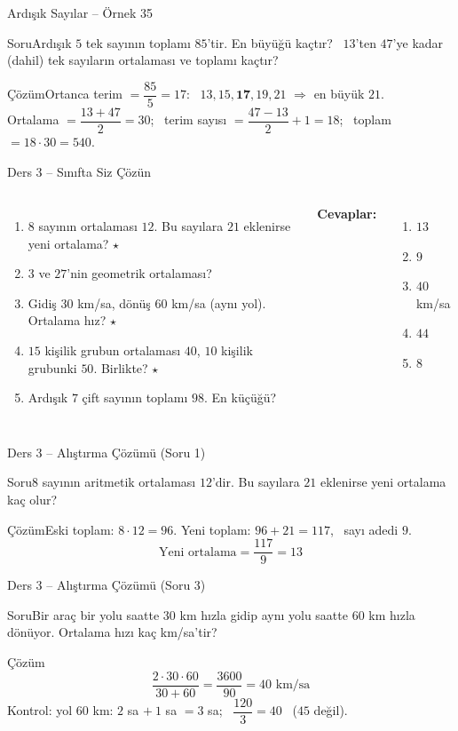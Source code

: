 \documentclass[aspectratio=169,11pt]{beamer}
\newcommand{\soru}[3]{%
\begin{frame}{#1}
  \begin{block}{Soru}\large #2\end{block}
  \pause
  \begin{exampleblock}{Çözüm}\large #3\end{exampleblock}
\end{frame}}
\begin{document}
\soru{Ardışık Sayılar -- Örnek 35}
{Ardışık \(5\) tek sayının toplamı \(85\)'tir. En büyüğü kaçtır? \ \(13\)'ten \(47\)'ye kadar (dahil) tek sayıların ortalaması ve toplamı kaçtır?}
{Ortanca terim \(=\dfrac{85}{5}=17\): \ \(13,15,\mathbf{17},19,21\) \(\Rightarrow\) en büyük \(21\).\\[3pt]
Ortalama \(=\dfrac{13+47}{2}=30\); \ terim sayısı \(=\dfrac{47-13}{2}+1=18\); \ toplam \(=18\cdot 30=540\).}

\begin{frame}{Ders 3 -- Sınıfta Siz Çözün}
\begin{columns}[t]
\begin{enumerate}
\item \(8\) sayının ortalaması \(12\). Bu sayılara \(21\) eklenirse yeni ortalama? \(\star\)
\item \(3\) ve \(27\)'nin geometrik ortalaması?
\item Gidiş \(30\) km/sa, dönüş \(60\) km/sa (aynı yol). Ortalama hız? \(\star\)
\item \(15\) kişilik grubun ortalaması \(40\), \(10\) kişilik grubunki \(50\). Birlikte? \(\star\)
\item Ardışık \(7\) çift sayının toplamı \(98\). En küçüğü?
\end{enumerate}
\pause
\textbf{Cevaplar:}
\begin{enumerate}
\item \(13\)
\item \(9\)
\item \(40\) km/sa
\item \(44\)
\item \(8\)
\end{enumerate}
\end{columns}
\vspace{4pt}{\footnotesize \(\star\) işaretli soruların adım adım çözümü sonraki slaytlardadır.}
\end{frame}

\soru{Ders 3 -- Alıştırma Çözümü (Soru 1)}
{\(8\) sayının aritmetik ortalaması \(12\)'dir. Bu sayılara \(21\) eklenirse yeni ortalama kaç olur?}
{Eski toplam: \(8\cdot 12=96\). \quad Yeni toplam: \(96+21=117\), \ sayı adedi \(9\).
\[\text{Yeni ortalama}=\frac{117}{9}=13\]}

\soru{Ders 3 -- Alıştırma Çözümü (Soru 3)}
{Bir araç bir yolu saatte \(30\) km hızla gidip aynı yolu saatte \(60\) km hızla dönüyor. Ortalama hızı kaç km/sa'tir?}
{\[\frac{2\cdot 30\cdot 60}{30+60}=\frac{3600}{90}=40\text{ km/sa}\]
Kontrol: yol \(60\) km: \(2\) sa \(+\ 1\) sa \(=3\) sa; \ \(\dfrac{120}{3}=40\) \checkmark \ (\(45\) değil).}
\end{document}
